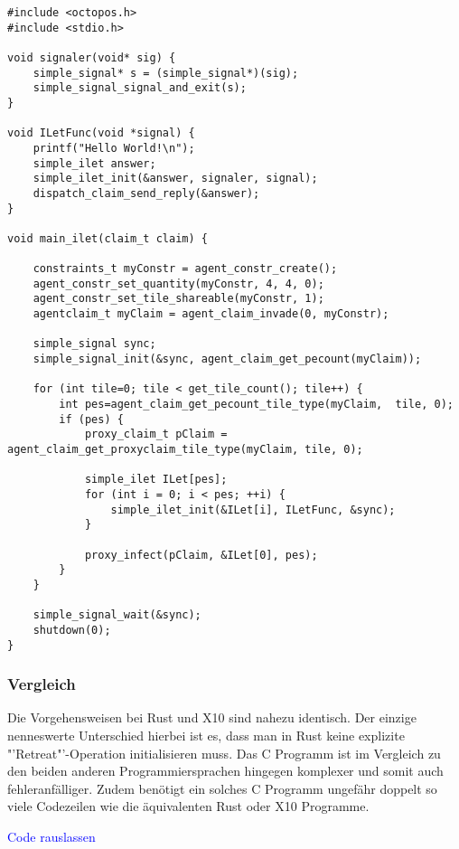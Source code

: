 \begin{lstlisting}[float,caption={Minimales Invade, Infect, Retreat in C},label=code:c_minimal_infect]
#include <octopos.h>
#include <stdio.h>

void signaler(void* sig) {
    simple_signal* s = (simple_signal*)(sig);
    simple_signal_signal_and_exit(s);
}

void ILetFunc(void *signal) {
    printf("Hello World!\n");
    simple_ilet answer;
    simple_ilet_init(&answer, signaler, signal);
    dispatch_claim_send_reply(&answer);
}

void main_ilet(claim_t claim) {

    constraints_t myConstr = agent_constr_create();
    agent_constr_set_quantity(myConstr, 4, 4, 0);
    agent_constr_set_tile_shareable(myConstr, 1);
    agentclaim_t myClaim = agent_claim_invade(0, myConstr);

    simple_signal sync;
    simple_signal_init(&sync, agent_claim_get_pecount(myClaim));

    for (int tile=0; tile < get_tile_count(); tile++) {
        int pes=agent_claim_get_pecount_tile_type(myClaim,  tile, 0);
        if (pes) {
            proxy_claim_t pClaim = agent_claim_get_proxyclaim_tile_type(myClaim, tile, 0);

            simple_ilet ILet[pes];
            for (int i = 0; i < pes; ++i) {
                simple_ilet_init(&ILet[i], ILetFunc, &sync);
            }

            proxy_infect(pClaim, &ILet[0], pes);
        }
    }

    simple_signal_wait(&sync);
    shutdown(0);
}
\end{lstlisting}

\subsubsection{Vergleich}

Die Vorgehensweisen bei Rust und X10 sind nahezu identisch. Der einzige nenneswerte Unterschied hierbei ist es, dass
man in Rust keine explizite "'Retreat"'-Operation initialisieren muss.
Das C Programm ist im Vergleich zu den beiden anderen Programmiersprachen hingegen komplexer und somit auch
fehleranfälliger. Zudem benötigt ein solches C Programm ungefähr doppelt so viele 
Codezeilen wie die äquivalenten Rust oder X10 Programme.

\textcolor{blue}{Code rauslassen}


